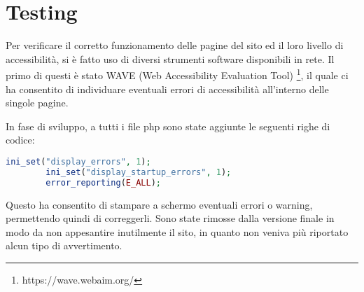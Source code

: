 \section{Testing}
	Per verificare il corretto funzionamento delle pagine del sito ed il loro livello di accessibilità, si è fatto uso di diversi strumenti software disponibili in rete.
	Il primo di questi è stato WAVE (Web Accessibility Evaluation Tool) \footnote{https://wave.webaim.org/}, il quale ci ha consentito di individuare eventuali errori di accessibilità all'interno delle singole pagine.

	In fase di sviluppo, a tutti i file php sono state aggiunte le seguenti righe di codice:

	\begin{lstlisting}[language=php, caption={php code using listings}]
		ini_set("display_errors", 1);
		ini_set("display_startup_errors", 1);
		error_reporting(E_ALL); 
	\end{lstlisting}

	Questo ha consentito di stampare a schermo eventuali errori o warning, permettendo quindi di correggerli.
	Sono state rimosse dalla versione finale in modo da non appesantire inutilmente il sito, in quanto non veniva più riportato alcun tipo di avvertimento.
